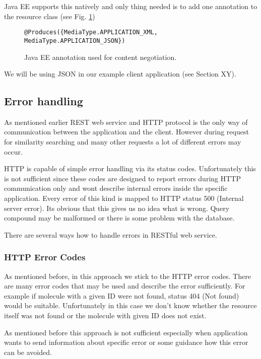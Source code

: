 \documentclass[thesis=M,english]{FITthesis}[2012/10/20]
\begin{document}
Java EE supports this natively and only thing needed is to add one annotation to the resource class (see Fig. \ref{contentNego})

\begin{figure}
\begin{lstlisting}
@Produces({MediaType.APPLICATION_XML, MediaType.APPLICATION_JSON})
\end{lstlisting}
\caption{Java EE annotation used for content negotiation.}
\label{contentNego}
\end{figure}

We will be using JSON in our example client application (see Section XY).

\subsection{Error handling}
As mentioned earlier REST web service and HTTP protocol is the only way of communication between the application and the client. However during request for similarity searching and many other requests a lot of different errors may occur.

HTTP is capable of simple error handling via its status codes. Unfortunately this is not sufficient since these codes are designed to report errors during HTTP communication only and wont describe internal errors inside the specific application. Every error of this kind is mapped to HTTP status 500 (Internal server error). Its obvious that this gives us no idea what is wrong. Query compound may be malformed or there is some problem with the database.

There are several ways how to handle errors in RESTful web service.

\subsubsection{HTTP Error Codes}
As mentioned before, in this approach we stick to the HTTP error codes. There are many error codes that may be used and describe the error sufficiently. For example if molecule with a given ID were not found, status 404 (Not found) would be suitable. Unfortunately in this case we don’t know whether the resource itself was not found or the molecule with given ID does not exist. 

As mentioned before this approach is not sufficient especially when application wants to send information about specific error or some guidance how this error can be avoided. 
\end{document}
